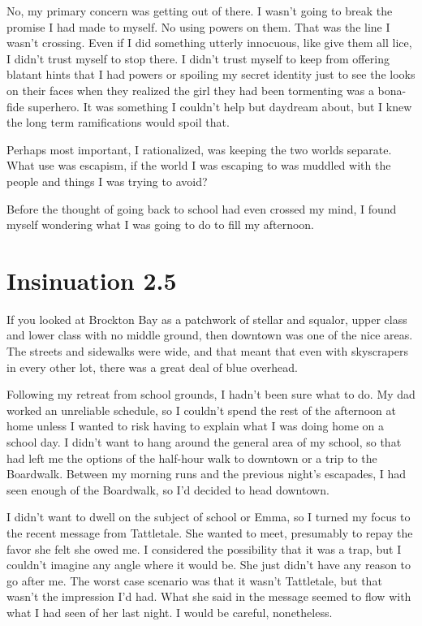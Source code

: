 No, my primary concern was getting out of there. I wasn't going to break the promise I had made to myself. No using powers on them. That was the line I wasn't crossing. Even if I did something utterly innocuous, like give them all lice, I didn't trust myself to stop there. I didn't trust myself to keep from offering blatant hints that I had powers or spoiling my secret identity just to see the looks on their faces when they realized the girl they had been tormenting was a bona-fide superhero. It was something I couldn't help but daydream about, but I knew the long term ramifications would spoil that.

Perhaps most important, I rationalized, was keeping the two worlds separate. What use was escapism, if the world I was escaping to was muddled with the people and things I was trying to avoid?

Before the thought of going back to school had even crossed my mind, I found myself wondering what I was going to do to fill my afternoon.


\chapter{Insinuation 2.5}

If you looked at Brockton Bay as a patchwork of stellar and squalor, upper class and lower class with no middle ground, then downtown was one of the nice areas. The streets and sidewalks were wide, and that meant that even with skyscrapers in every other lot, there was a great deal of blue overhead.

Following my retreat from school grounds, I hadn't been sure what to do. My dad worked an unreliable schedule, so I couldn't spend the rest of the afternoon at home unless I wanted to risk having to explain what I was doing home on a school day. I didn't want to hang around the general area of my school, so that had left me the options of the half-hour walk to downtown or a trip to the Boardwalk. Between my morning runs and the previous night's escapades, I had seen enough of the Boardwalk, so I'd decided to head downtown.

I didn't want to dwell on the subject of school or Emma, so I turned my focus to the recent message from Tattletale. She wanted to meet, presumably to repay the favor she felt she owed me. I considered the possibility that it was a trap, but I couldn't imagine any angle where it would be. She just didn't have any reason to go after me. The worst case scenario was that it wasn't Tattletale, but that wasn't the impression I'd had. What she said in the message seemed to flow with what I had seen of her last night. I would be careful, nonetheless.

